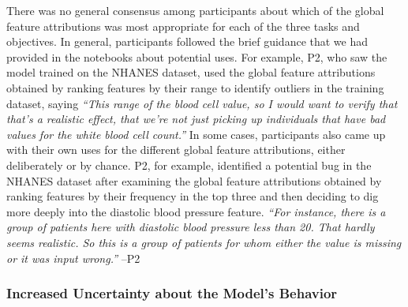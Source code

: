 \documentclass[11pt,dvipdfmx]{article}
\begin{document}
There was no general consensus among participants about which of the
global feature attributions was most appropriate for each of the three
tasks and objectives.  In general, participants followed the brief
guidance that we had provided in the notebooks about potential uses.
For example, P2, who saw the model trained on the NHANES dataset, used
the global feature attributions obtained by ranking features by their
range to identify outliers in the training dataset, saying
\textit{``This range of the blood cell value, so I would want to
  verify that that's a realistic effect, that we're not just picking
  up individuals that have bad values for the white blood cell
  count.''}  In some cases, participants also came up with their own
uses for the different global feature attributions, either
deliberately or by chance. P2, for example, identified a potential bug
in the NHANES dataset after examining the global feature attributions
obtained by ranking features by their frequency in the top three and
then deciding to dig more deeply into the diastolic blood pressure
feature.  \textit{``For instance, there is a group of patients here
  with diastolic blood pressure less than 20. That hardly seems
  realistic. So this is a group of patients for whom either the value
  is missing or it was input wrong.''} --P2

\subsubsection{Increased Uncertainty about the Model's Behavior}
\end{document}
